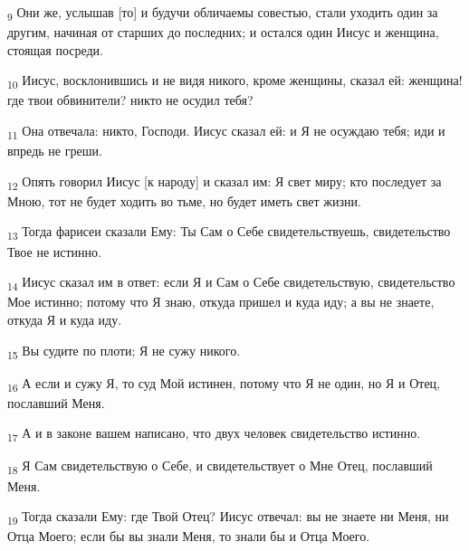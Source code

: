 \begin{tcolorbox}
\textsubscript{9} Они же, услышав [то] и будучи обличаемы совестью, стали уходить один за другим, начиная от старших до последних; и остался один Иисус и женщина, стоящая посреди.
\end{tcolorbox}
\begin{tcolorbox}
\textsubscript{10} Иисус, восклонившись и не видя никого, кроме женщины, сказал ей: женщина! где твои обвинители? никто не осудил тебя?
\end{tcolorbox}
\begin{tcolorbox}
\textsubscript{11} Она отвечала: никто, Господи. Иисус сказал ей: и Я не осуждаю тебя; иди и впредь не греши.
\end{tcolorbox}
\begin{tcolorbox}
\textsubscript{12} Опять говорил Иисус [к народу] и сказал им: Я свет миру; кто последует за Мною, тот не будет ходить во тьме, но будет иметь свет жизни.
\end{tcolorbox}
\begin{tcolorbox}
\textsubscript{13} Тогда фарисеи сказали Ему: Ты Сам о Себе свидетельствуешь, свидетельство Твое не истинно.
\end{tcolorbox}
\begin{tcolorbox}
\textsubscript{14} Иисус сказал им в ответ: если Я и Сам о Себе свидетельствую, свидетельство Мое истинно; потому что Я знаю, откуда пришел и куда иду; а вы не знаете, откуда Я и куда иду.
\end{tcolorbox}
\begin{tcolorbox}
\textsubscript{15} Вы судите по плоти; Я не сужу никого.
\end{tcolorbox}
\begin{tcolorbox}
\textsubscript{16} А если и сужу Я, то суд Мой истинен, потому что Я не один, но Я и Отец, пославший Меня.
\end{tcolorbox}
\begin{tcolorbox}
\textsubscript{17} А и в законе вашем написано, что двух человек свидетельство истинно.
\end{tcolorbox}
\begin{tcolorbox}
\textsubscript{18} Я Сам свидетельствую о Себе, и свидетельствует о Мне Отец, пославший Меня.
\end{tcolorbox}
\begin{tcolorbox}
\textsubscript{19} Тогда сказали Ему: где Твой Отец? Иисус отвечал: вы не знаете ни Меня, ни Отца Моего; если бы вы знали Меня, то знали бы и Отца Моего.
\end{tcolorbox}
